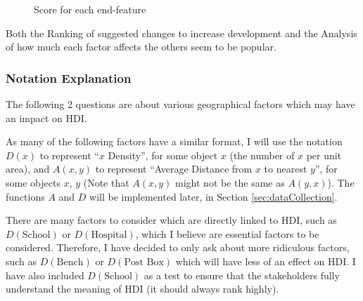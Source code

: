 \documentclass[12pt]{report}
\begin{document}
\begin{figure}[H]
\centering
{}
\caption{Score for each end-feature}
\end{figure}
Both the Ranking of suggested changes to increase development and the Analysis of how much each factor affects the others seem to be popular.

\subsubsection{Notation Explanation}
The following 2 questions are about various geographical factors which may have an impact on HDI.

As many of the following factors have a similar format, I will use the notation $D\left(x\right)$ to represent ``$x$ Density'', for some object $x$ (the number of $x$ per unit area), and $A\left(x,y\right)$ to represent ``Average Distance from $x$ to nearest $y$'', for some objects $x$, $y$ (Note that $A\left(x,y\right)$ might not be the same as $A\left(y,x\right)$). The functions $A$ and $D$ will be implemented later, in Section \ref{sec:dataCollection}.

There are many factors to consider which are directly linked to HDI, such as $D\left(\text{School}\right)$ or $D\left(\text{Hospital}\right)$, which I believe are essential factors to be considered. Therefore, I have decided to only ask about more ridiculous factors, such as $D\left(\text{Bench}\right)$ or $D\left(\text{Post Box}\right)$ which will have less of an effect on HDI. I have also included $D\left(\text{School}\right)$ as a test to ensure that the stakeholders fully understand the meaning of HDI (it should always rank highly).
\end{document}
